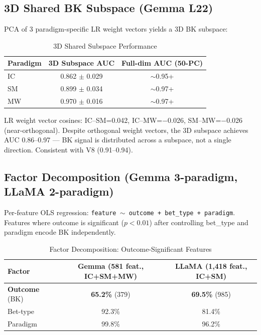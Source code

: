 \documentclass[11pt,a4paper]{article}
\begin{document}
\subsection{3D Shared BK Subspace (Gemma L22)}

PCA of 3 paradigm-specific LR weight vectors yields a 3D BK subspace:

\begin{table}[H]
\centering
\caption{3D Shared Subspace Performance}\label{tab:t14}
\footnotesize
\begin{tabular}{lcc}
\toprule
Paradigm & 3D Subspace AUC & Full-dim AUC (50-PC) \\
\midrule
IC & 0.862 $\pm$ 0.029 & $\sim$0.95+ \\
SM & 0.899 $\pm$ 0.034 & $\sim$0.97+ \\
MW & 0.970 $\pm$ 0.016 & $\sim$0.97+ \\
\bottomrule
\end{tabular}
\end{table}

\noindent LR weight vector cosines: IC--SM=0.042, IC--MW=$-$0.026, SM--MW=$-$0.026 (near-orthogonal). Despite orthogonal weight vectors, the 3D subspace achieves AUC 0.86--0.97 --- BK signal is distributed across a subspace, not a single direction. Consistent with V8 (0.91--0.94).

\subsection{Factor Decomposition (Gemma 3-paradigm, LLaMA 2-paradigm)}

Per-feature OLS regression: \texttt{feature $\sim$ outcome + bet\_type + paradigm}. Features where outcome is significant ($p<0.01$) after controlling bet\_type and paradigm encode BK independently.

\begin{table}[H]
\centering
\caption{Factor Decomposition: Outcome-Significant Features}\label{tab:t15}
\footnotesize
\begin{tabular}{lcc}
\toprule
Factor & Gemma (581 feat., IC+SM+MW) & LLaMA (1,418 feat., IC+SM) \\
\midrule
\textbf{Outcome} (BK) & \textbf{65.2\%} (379) & \textbf{69.5\%} (985) \\
Bet-type            & 92.3\% & 81.4\% \\
Paradigm            & 99.8\% & 96.2\% \\
\bottomrule
\end{tabular}
\end{table}
\end{document}
